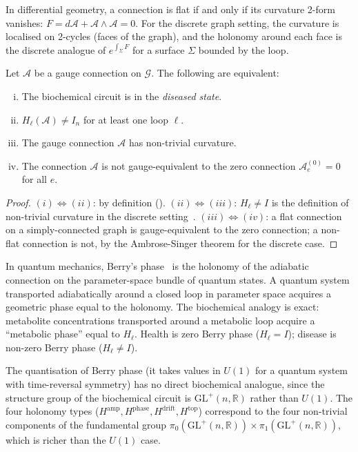 In differential geometry, a connection is flat if and only if its curvature
2-form vanishes: $F = d\mathcal{A} + \mathcal{A} \wedge \mathcal{A} = 0$.
For the discrete graph setting, the curvature is localised on 2-cycles
(faces of the graph), and the holonomy around each face is the discrete
analogue of $e^{\int_\Sigma F}$ for a surface $\Sigma$ bounded by the loop.

\begin{proposition}
\label{prop:ch11-disease-curvature}
Let $\mathcal{A}$ be a gauge connection on $\mathcal{G}$.  The following are
equivalent:
\begin{enumerate}[(i)]
  \item The biochemical circuit is in the \emph{diseased state}.
  \item $H_\ell(\mathcal{A}) \neq I_n$ for at least one loop $\ell$.
  \item The gauge connection $\mathcal{A}$ has non-trivial curvature.
  \item The connection $\mathcal{A}$ is not gauge-equivalent to the zero
    connection $\mathcal{A}^{(0)}_e = 0$ for all $e$.
\end{enumerate}
\end{proposition}

\begin{proof}
$(i) \Leftrightarrow (ii)$: by definition ().
$(ii) \Leftrightarrow (iii)$: $H_\ell \neq I$ is the definition of non-trivial
curvature in the discrete setting~\citep{Nakahara2003}.
$(iii) \Leftrightarrow (iv)$: a flat connection on a simply-connected graph is
gauge-equivalent to the zero connection; a non-flat connection is not, by the
Ambrose-Singer theorem for the discrete case.
\end{proof}

\begin{remark}
In quantum mechanics, Berry's phase~\citep{Berry1984} is the holonomy of the
adiabatic connection on the parameter-space bundle of quantum states.  A
quantum system transported adiabatically around a closed loop in parameter space
acquires a geometric phase equal to the holonomy.  The biochemical analogy is
exact: metabolite concentrations transported around a metabolic loop acquire
a ``metabolic phase'' equal to $H_\ell$.  Health is zero Berry phase
($H_\ell = I$); disease is non-zero Berry phase ($H_\ell \neq I$).

The quantisation of Berry phase (it takes values in $U(1)$ for a quantum system
with time-reversal symmetry) has no direct biochemical analogue, since the
structure group of the biochemical circuit is $\mathrm{GL}^+(n,\mathbb{R})$
rather than $U(1)$.  The four holonomy types
($H^{\mathrm{amp}}, H^{\mathrm{phase}}, H^{\mathrm{drift}}, H^{\mathrm{top}}$)
correspond to the four non-trivial components of the fundamental group
$\pi_0(\mathrm{GL}^+(n,\mathbb{R})) \times \pi_1(\mathrm{GL}^+(n,\mathbb{R}))$,
which is richer than the $U(1)$ case.
\end{remark}

